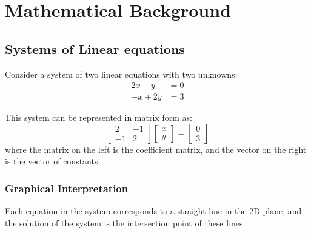 \chapter{Mathematical Background}
\section{Systems of Linear equations}

Consider a system of two linear equations with two unknowns:
\begin{align}
    2x - y &= 0 \\
    -x + 2y &= 3
\end{align}

This system can be represented in matrix form as:
\begin{equation*}
    \begin{bmatrix}
        2 & -1 \\
        -1 & 2
    \end{bmatrix}
    \begin{bmatrix}
        x \\
        y
    \end{bmatrix}
    =
    \begin{bmatrix}
        0 \\
        3
    \end{bmatrix}
\end{equation*}
where the matrix on the left is the coefficient matrix, and the vector on the right is the vector of constants.

\subsection*{Graphical Interpretation}

Each equation in the system corresponds to a straight line in the 2D plane, and the solution of the system is the intersection point of these lines.

\begin{center}
\end{center}

